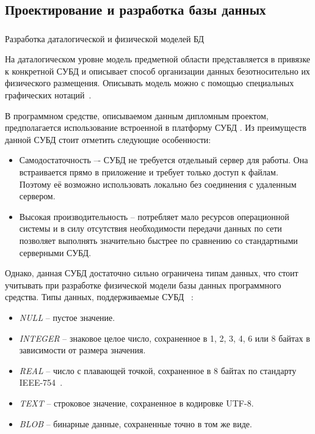 \subsection{Проектирование и разработка базы данных}
\label{sec:design:database}

\subsubsection{} Разработка даталогической и физической моделей БД
\label{sec:design:database:model}

На даталогическом уровне модель предметной области представляется в привязке к конкретной СУБД и описывает способ организации данных безотносительно их физического размещения.
Описывать модель можно с помощью специальных графических нотаций~\cite{kulikov_db_workbook}.

В программном средстве, описываемом данным дипломным проектом, предполагается использование встроенной в платформу \andro СУБД \sqlite.
Из преимуществ данной СУБД стоит отметить следующие особенности:
\begin{itemize}
    \item Самодостаточность –- СУБД \sqlite не требуется отдельный сервер для работы.
    Она встраивается прямо в приложение и требует только доступ к файлам.
    Поэтому её возможно использовать локально без соединения с удаленным сервером.
    \item Высокая производительность – \sqlite потребляет мало ресурсов операционной системы и в силу отсутствия необходимости передачи данных по сети позволяет выполнять значительно быстрее по сравнению со стандартными серверными СУБД.
\end{itemize}

Однако, данная СУБД достаточно сильно ограничена типам данных, что стоит учитывать при разработке физической модели базы данных программного средства.
Типы данных, поддерживаемые СУБД \sqlite~\cite{sqlite_types}:
\begin{itemize}
    \item \emph{NULL} -- пустое значение.
    \item \emph{INTEGER} -- знаковое целое число, сохраненное в 1, 2, 3, 4, 6 или 8 байтах в зависимости от размера значения.
    \item \emph{REAL} -- число с плавающей точкой, сохраненное в 8 байтах по стандарту IEEE-754~\cite{ieee_754}.
    \item \emph{TEXT} -- строковое значение, сохраненное в кодировке UTF-8.
    \item \emph{BLOB} -- бинарные данные, сохраненные точно в том же виде.
\end{itemize}

